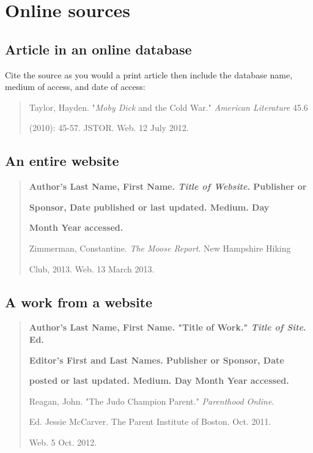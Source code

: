 \section{Online sources}

\subsection{Article in an online database}
Cite the source as you would a print article then include the database name, medium of access, and date of access:

\begin{quote}
Taylor, Hayden. "\emph{Moby Dick} and the Cold War." \emph{American Literature} 45.6 

\hspace{.4in}(2010): 45-57. JSTOR. Web. 12 July 2012.
\end{quote}

\subsection{An entire website} 

\begin{quote}
\textbf{Author's Last Name, First Name. \emph{Title of Website}. Publisher or}

\hspace{.4in}\textbf{Sponsor, Date published or last updated. Medium. Day} 

\hspace{.4in}\textbf{Month Year accessed.}

\medskip
Zimmerman, Constantine. \emph{The Moose Report}. New Hampshire Hiking

\hspace{.4in} Club, 2013. Web. 13 March 2013.
\end{quote}

\subsection{A work from a website}

\begin{quote}
\textbf{Author's Last Name, First Name. "Title of Work." \emph{Title of Site}. Ed.} 

\hspace{.4in}\textbf{Editor's First and Last Names. Publisher or Sponsor, Date} 

\hspace{.4in}\textbf{posted or last updated. Medium. Day Month Year accessed.}
\medskip

Reagan, John. "The Judo Champion Parent." \emph{Parenthood Online}. 

\hspace{.4in}Ed. Jessie McCarver. The Parent Institute of Boston. Oct. 2011. 

\hspace{.4in}Web. 5 Oct. 2012.

\end{quote}

